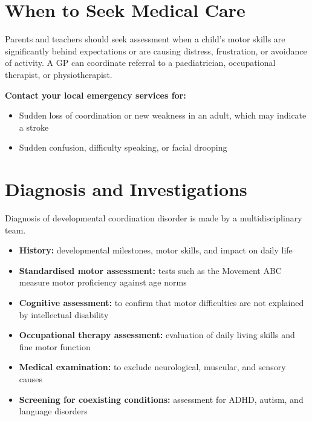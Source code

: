 \section*{When to Seek Medical Care}
Parents and teachers should seek assessment when a child's motor skills are significantly behind expectations or are causing distress, frustration, or avoidance of activity. A GP can coordinate referral to a paediatrician, occupational therapist, or physiotherapist.

\textbf{Contact your local emergency services for:}
\begin{itemize}
    \item Sudden loss of coordination or new weakness in an adult, which may indicate a stroke
    \item Sudden confusion, difficulty speaking, or facial drooping
\end{itemize}

\section*{Diagnosis and Investigations}
Diagnosis of developmental coordination disorder is made by a multidisciplinary team.
\begin{itemize}
    \item \textbf{History:} developmental milestones, motor skills, and impact on daily life
    \item \textbf{Standardised motor assessment:} tests such as the Movement ABC measure motor proficiency against age norms
    \item \textbf{Cognitive assessment:} to confirm that motor difficulties are not explained by intellectual disability
    \item \textbf{Occupational therapy assessment:} evaluation of daily living skills and fine motor function
    \item \textbf{Medical examination:} to exclude neurological, muscular, and sensory causes
    \item \textbf{Screening for coexisting conditions:} assessment for ADHD, autism, and language disorders
\end{itemize}

